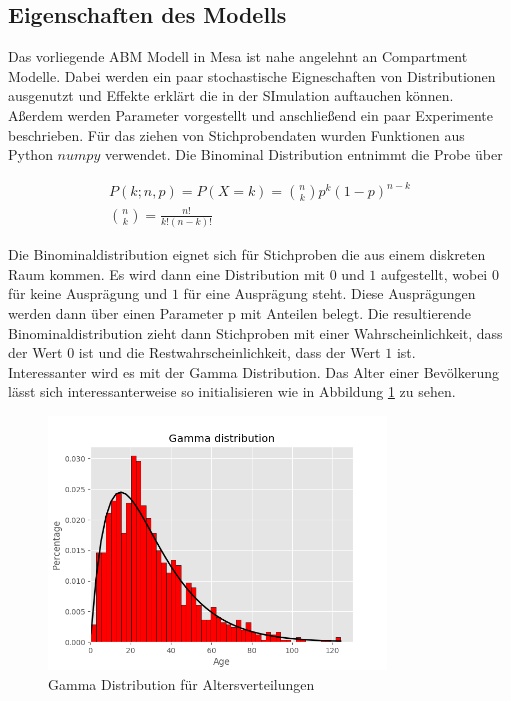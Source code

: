 \documentclass[paper=a4, fontsize=11pt, ngerman, abstract=on]{scrartcl}
\numberwithin{equation}{section} %
\numberwithin{figure}{section} %
\numberwithin{table}{section} %
\begin{document}
\subsection{Eigenschaften des Modells}

Das vorliegende ABM Modell in Mesa ist nahe angelehnt an Compartment Modelle. Dabei werden ein paar stochastische Eigneschaften von Distributionen ausgenutzt und Effekte erklärt die in der SImulation auftauchen können. Aßerdem werden Parameter vorgestellt und anschließend ein paar Experimente beschrieben. Für das ziehen von Stichprobendaten wurden Funktionen aus Python $numpy$ verwendet. Die Binominal Distribution entnimmt die Probe über

\begin{gather*}
  P(k; n, p) = P(X = k) = \binom{n}{k}p^{k}(1 - p)^{n - k} \\
  \binom{n}{k} = \frac{n!}{k!(n-k)!}
\end{gather*}

Die Binominaldistribution eignet sich für Stichproben die aus einem diskreten Raum kommen. Es wird dann eine Distribution mit $0$ und $1$ aufgestellt, wobei $0$ für keine Ausprägung und $1$ für eine Ausprägung steht. Diese Ausprägungen werden dann über einen Parameter p mit Anteilen belegt. Die resultierende Binominaldistribution zieht dann Stichproben mit einer Wahrscheinlichkeit, dass der Wert $0$ ist und die Restwahrscheinlichkeit, dass der Wert $1$ ist. \\

Interessanter wird es mit der Gamma Distribution. Das Alter einer Bevölkerung lässt sich interessanterweise so initialisieren wie in Abbildung \ref{fig:gamma-age-dist} zu sehen.

\begin{figure}[ht]
  \centering
  \includegraphics[width=0.8\textwidth,keepaspectratio]{images/gamma-age-dist}
  \caption{Gamma Distribution für Altersverteilungen}
  \label{fig:gamma-age-dist}
\end{figure}
\end{document}
